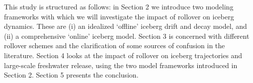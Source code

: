 \documentclass[twocol]{ametsoc_tw}
\begin{document}
This study is structured as follows: in Section 2 we introduce two modeling frameworks with which we will investigate the impact of rollover on iceberg dynamics. These are (i) an idealized `offline' iceberg drift and decay model, and (ii) a comprehensive `online' iceberg model. Section 3 is concerned with different rollover schemes and the clarification of some sources of confusion in the literature. Section 4 looks at the impact of rollover on iceberg trajectories and large-scale freshwater release, using the two model frameworks introduced in Section 2. Section 5 presents the conclusion.
%
%
\end{document}
